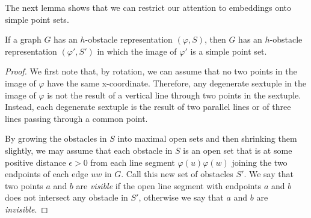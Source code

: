 \documentclass{patmorin}
\begin{document}
The next lemma shows that we can restrict our attention to embeddings
onto simple point sets.

\begin{lem}
  If a graph $G$ has an $h$-obstacle representation $(\varphi, S)$,
  then $G$ has an $h$-obstacle representation $(\varphi',S')$ in which
  the image of $\varphi'$ is a simple point set.
\end{lem}

\begin{proof}
  We first note that, by rotation, we can assume that no two points
  in the image of $\varphi$ have the same x-coordinate.  Therefore,
  any degenerate sextuple in the image of $\varphi$ is not the result
  of a vertical line through two points in the sextuple.  Instead, each
  degenerate sextuple is the result of two parallel lines or of three
  lines passing through a common point.

  By growing the obstacles in $S$ into maximal open sets and then
  shrinking them slightly, we may assume that each obstacle in $S$ is
  an open set that is at some positive distance $\epsilon >0$ from each
  line segment $\varphi(u)\varphi(w)$ joining the two endpoints of each
  edge $uw$ in $G$.  Call this new set of obstacles $S'$.  We say that
  two points $a$ and $b$ are \emph{visible} if the open line segment
  with endpoints $a$ and $b$ does not intersect any obstacle in $S'$,
  otherwise we say that $a$ and $b$ are \emph{invisible}.


\end{proof}
\end{document}
